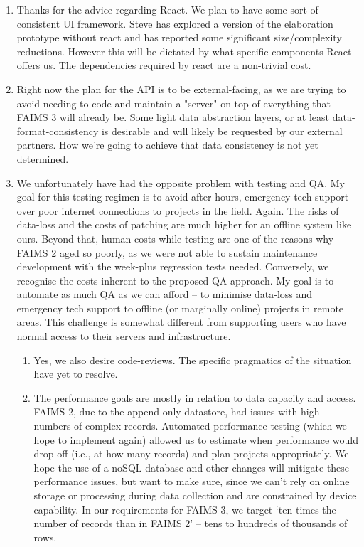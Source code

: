 \documentclass[a4paper,headings=small fontsize=10pt]{scrreprt}
\begin{document}
\begin{enumerate}
\def\labelenumi{\arabic{enumi}.}
\item Thanks for the advice regarding React. We plan to have some sort of
  consistent UI framework. Steve has explored a version of the
  elaboration prototype without react and has reported some significant
  size/complexity reductions. However this will be dictated by what
  specific components React offers us. The dependencies required by react
  are a non-trivial cost.
 
\item Right now the plan for the API is to be external-facing, as we
  are trying to avoid needing to code and maintain a "server" on top of
  everything that FAIMS 3 will already be. Some light data abstraction
  layers, or at least data-format-consistency is desirable and
  will likely be requested by our external partners. How we're going to
  achieve that data consistency is not yet determined.
 
\item We unfortunately have had the opposite problem with testing and QA. 
  My goal for this testing regimen is to avoid after-hours, emergency tech 
  support over poor internet connections to projects in the field. Again. 
  The risks of data-loss and the costs of patching are much higher for an 
  offline system like ours. Beyond that, human costs while testing are one 
  of the reasons why FAIMS 2 aged so poorly, as we were not able to sustain 
  maintenance development with the week-plus regression tests needed. 
  Conversely, we recognise the costs inherent to the proposed QA approach. 
  My goal is to automate as much QA as we can afford -- to minimise data-loss and
  emergency tech support to offline (or marginally online) projects in remote areas. 
  This challenge is somewhat different from supporting users who have normal access 
  to their servers and infrastructure.
 

  \begin{enumerate}
  \def\labelenumii{\alph{enumii}.}
  \item Yes, we also desire code-reviews. The specific pragmatics of the
    situation have yet to resolve.
   
  \item The performance goals are mostly in relation to data capacity and
    access. FAIMS 2, due to the append-only datastore, had issues with
    high numbers of complex records. Automated performance testing (which we hope 
    to implement again) allowed us to estimate when performance would drop off 
    (i.e., at how many records) and plan projects appropriately. We hope the use 
    of a noSQL database and other changes 
    will mitigate these performance issues, but want to make sure, since we can't 
    rely on online storage or processing during data collection and are constrained by device capability.
    In our requirements for FAIMS 3, we target `ten times the number of records than in FAIMS 2' 
    -- tens to hundreds of thousands of rows. 
    

\end{enumerate}
\end{enumerate}
\end{document}
